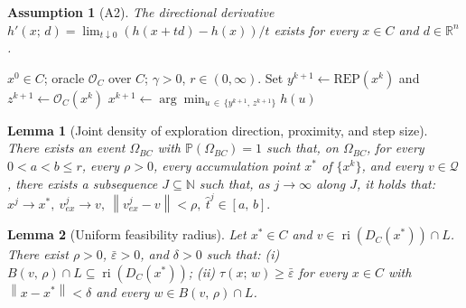 \documentclass[10pt,a4paper]{amsart}
\newtheorem{assumption}{Assumption}
\newtheorem{lemma}{Lemma}
\newcommand{\N}{\mathbb{N}}
\newcommand{\R}{\mathbb{R}}
\newcommand{\norm}[1]{\left\|#1\right\|}
\DeclareMathOperator{\ri}{ri}
\begin{document}
\begin{assumption}[A2]\label{ass:A2}
The directional derivative $h'(x;\, d) = \lim_{t \downarrow 0}(h(x + td) - h(x))/t$ exists for every $x \in C$ and $d \in \R^n$.
\end{assumption}

\begin{algorithm}
\caption{Random exploration procedure implementation}
\label{alg:random}
\begin{algorithmic}[1]
\Require $x^0 \in C$; oracle $\mathcal{O}_C$ over $C$; $\gamma > 0$, $r \in (0,\infty)$.
  \State Set $y^{k+1} \leftarrow \mathrm{REP}(x^k)$ and  $z^{k+1} \leftarrow \mathcal{O}_C(x^k)$
  \State $x^{k+1} \leftarrow \arg\min_{u\,\in\,\{y^{k+1},\,z^{k+1}\}} h(u)$
\EndFor
\end{algorithmic}
\end{algorithm}

\begin{lemma}[Joint density of exploration direction, proximity, and step size]\label{lem:BC-directions}
There exists an event $\Omega_{BC}$ with $\mathbb{P}(\Omega_{BC})=1$ such that, on $\Omega_{BC}$, for every $0 < a < b \leq r$, every $\rho > 0$, every accumulation point $x^*$ of $\{x^k\}$, and every $v \in \mathcal{Q}$, there exists a subsequence $J \subseteq \N$ such that, as $j \to \infty$ along $J$, it holds that: $x^j \to x^*,\ v^j_{ex} \to v,\ \norm{v^j_{ex} - v} < \rho,\ \hat{t}^j \in [a,\, b].$
\end{lemma}

\begin{lemma}[Uniform feasibility radius]\label{lem:step-bound}
Let $x^* \in C$ and $v \in \ri(D_C(x^*)) \cap L$. There exist $\rho > 0$, $\bar{\varepsilon} > 0$, and $\delta > 0$ such that: (i)  $B(v,\, \rho) \cap L \subseteq \ri(D_C(x^*))$; (ii) $\tau(x;\, w) \geq \bar{\varepsilon}$ for every $x \in C$ with $\norm{x - x^*} < \delta$ and every $w \in B(v,\, \rho) \cap L$.
\end{lemma}
\end{document}
